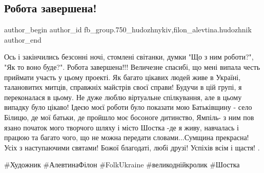  
 
 
 
 

\subsection{Робота завершена!}
\label{sec:04_04_2018.fb.fb_group.750_hudozhnykiv.3.robota_zavershena_krolik_jampil_bilycja_shostka}
 
\ifcmt
 author_begin
   author_id fb_group.750_hudozhnykiv,filon_alevtina.hudozhnik
 author_end
\fi

Ось і закінчились безсонні ночі, стомлені світанки, думки "Що з ним роботи?",
"Як то воно буде?". Робота завершена!!! Величезне спасибі, що мені випала честь
приймати участь у цьому проекті. Як багато цікавих людей живе в Україні,
талановитих митців, справжніх майстрів своєї справи! Будучи в цій групі, я
переконалася в цьому. Не дуже люблю віртуальне спілкування, але в цьому випадку
було цікаво! Ідеєю моєї роботи було показати мою Батьківщину - село Білицю, де
мої батьки, де пройшло моє босоноге  дитинство, Ямпіль- з ним пов язано початок
мого творчого шляху і місто Шостка -де я живу, навчалась і працюю та багато
чого, що не можна передати словами...Сумщина прекрасна! Усіх з наступаючими
святами! Божої благодаті, любі друзі! Успіхів всім і щастя! . 

\#Художник \#АлевтинаФілон \#FolkUkraine \#великоднійкролик \#Шостка
